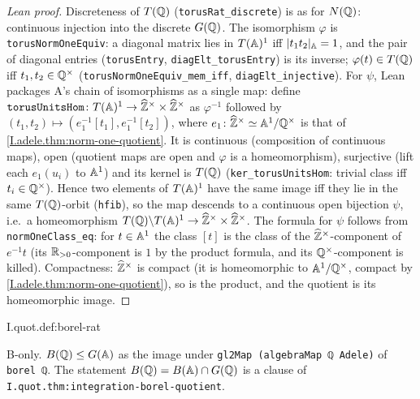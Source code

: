 \begin{proof}[Lean proof]
Discreteness of $T(\mathbb{Q})$ (\texttt{torusRat\_discrete}) is as for $N(\mathbb{Q})$: continuous injection into the discrete $G(\mathbb{Q})$. The isomorphism $\varphi$ is \texttt{torusNormOneEquiv}: a diagonal matrix lies in $T(\mathbb{A})^1$ iff $\lvert t_1t_2\rvert_{\mathbb{A}}=1$, and the pair of diagonal entries (\texttt{torusEntry}, \texttt{diagElt\_torusEntry}) is its inverse; $\varphi(t)\in T(\mathbb{Q})$ iff $t_1,t_2\in\mathbb{Q}^\times$ (\texttt{torusNormOneEquiv\_mem\_iff}, \texttt{diagElt\_injective}). For $\psi$, Lean packages A's chain of isomorphisms as a single map: define $\texttt{torusUnitsHom}\colon T(\mathbb{A})^1\to\widehat{\mathbb{Z}}^\times\times\widehat{\mathbb{Z}}^\times$ as $\varphi^{-1}$ followed by $(t_1,t_2)\mapsto(e_1^{-1}[t_1],e_1^{-1}[t_2])$, where $e_1\colon\widehat{\mathbb{Z}}^\times\simeq\mathbb{A}^1/\mathbb{Q}^\times$ is that of \cref{I.adele.thm:norm-one-quotient}. It is continuous (composition of continuous maps), open (quotient maps are open and $\varphi$ is a homeomorphism), surjective (lift each $e_1(u_i)$ to $\mathbb{A}^1$) and its kernel is $T(\mathbb{Q})$ (\texttt{ker\_torusUnitsHom}: trivial class iff $t_i\in\mathbb{Q}^\times$). Hence two elements of $T(\mathbb{A})^1$ have the same image iff they lie in the same $T(\mathbb{Q})$-orbit (\texttt{hfib}), so the map descends to a continuous open bijection $\psi$, i.e.\ a homeomorphism $T(\mathbb{Q})\backslash T(\mathbb{A})^1\to\widehat{\mathbb{Z}}^\times\times\widehat{\mathbb{Z}}^\times$. The formula for $\psi$ follows from \texttt{normOneClass\_eq}: for $t\in\mathbb{A}^1$ the class $[t]$ is the class of the $\widehat{\mathbb{Z}}^\times$-component of $e^{-1}t$ (its $\mathbb{R}_{>0}$-component is $1$ by the product formula, and its $\mathbb{Q}^\times$-component is killed). Compactness: $\widehat{\mathbb{Z}}^\times$ is compact (it is homeomorphic to $\mathbb{A}^1/\mathbb{Q}^\times$, compact by \cref{I.adele.thm:norm-one-quotient}), so is the product, and the quotient is its homeomorphic image.
\end{proof}

\begin{definition}[$B(\Q)$ inside $G(\A)$]
\bonly
{}
\end{definition}
\begin{tfformal}{I.quot.def:borel-rat}
\begin{tffidelity}
B-only. $B(\mathbb{Q})\le G(\mathbb{A})$ as the image under \texttt{gl2Map (algebraMap ℚ Adele)} of \texttt{borel ℚ}. The statement $B(\mathbb{Q})=B(\mathbb{A})\cap G(\mathbb{Q})$ is a clause of \texttt{I.quot.thm:integration-borel-quotient}.
\end{tffidelity}
\end{tfformal}

